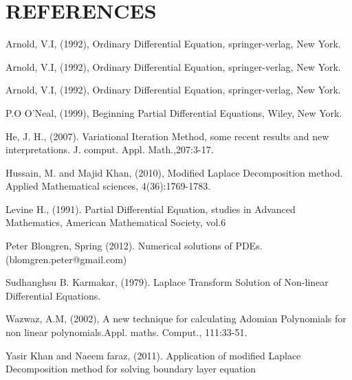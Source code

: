 \documentclass[12pt]{report}
\begin{document}
\section{REFERENCES}
\begin{description}
	
  \item Arnold, V.I, (1992), Ordinary Differential Equation, springer-verlag, New York.
  \item Arnold, V.I, (1992), Ordinary Differential Equation, springer-verlag, New York.
  \item Arnold, V.I, (1992), Ordinary Differential Equation, springer-verlag, New York.    \item P.O O'Neal, (1999), Beginning Partial Differential Equations, Wiley, New York.
  \item He, J. H., (2007). Variational Iteration Method, some recent results and new interpretations. J. comput. Appl. Math.,207:3-17.
  \item Hussain, M. and Majid Khan, (2010), Modified Laplace Decomposition method. Applied Mathematical sciences, 4(36):1769-1783.
  \item Levine H., (1991). Partial Differential Equation, studies in Advanced Mathematics, American Mathematical Society, vol.6
 
  \item Peter Blongren, Spring (2012). Numerical solutions of PDEs. (blomgren.peter@gmail.com)
  \item Sudhanghsu B. Karmakar, (1979). Laplace Transform Solution of Non-linear Differential Equations.
  \item Wazwaz, A.M, (2002), A new technique for calculating Adomian Polynomials for non linear polynomials.Appl. maths. Comput., 111:33-51.

 \item Yasir Khan and Naeem faraz, (2011). Application of modified Laplace Decomposition method for solving boundary layer equation
\end{description}
\end{document}
